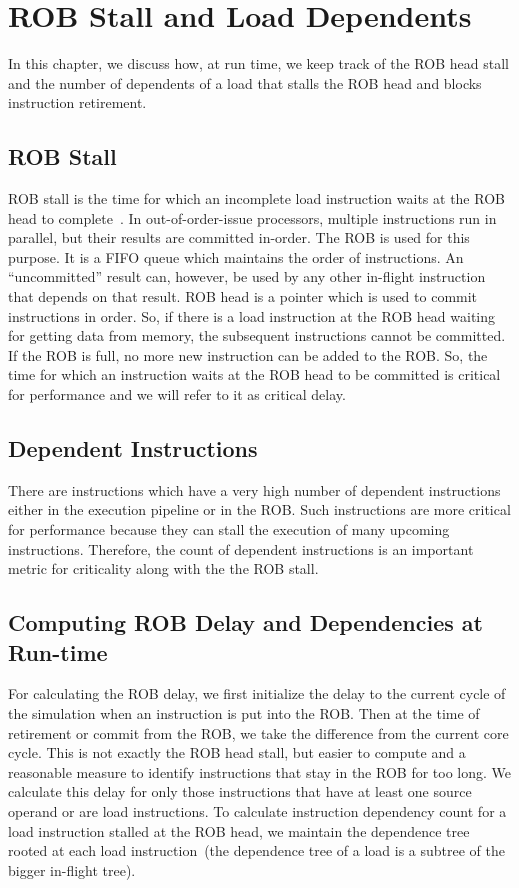 
\chapter{ROB Stall and Load Dependents}\label{ROB}\label{Chapter3:Recording ROB delay and ROB dependencies}
In this chapter, we discuss how, at run time, we keep track of the ROB head stall and the number of dependents of a load that stalls the ROB head and blocks instruction retirement.

\section{ROB Stall}
ROB stall is the  time for which an incomplete load instruction waits at the ROB head to complete~\cite{Superscalar}. In out-of-order-issue processors, multiple instructions run in parallel, but their results are committed in-order. The ROB is used for this purpose. It is a FIFO queue which maintains the order of instructions. An ``uncommitted'' result can, however, be used by any other in-flight instruction that depends on that result.
ROB head is a pointer which is used to commit instructions in order. So, if there is a load instruction at the ROB head waiting for getting data from memory, the subsequent instructions cannot be committed. If the ROB is full, no more new instruction can be added to the ROB.
So, the time for which an instruction waits at the ROB head to be committed is critical for performance and we will refer to it as critical delay.

\section{Dependent Instructions}
There are instructions which have a very high number of dependent instructions either in the execution pipeline or in the ROB. Such instructions are more critical for performance because they can stall the execution of many upcoming instructions. Therefore, the count of dependent instructions is an important metric for criticality along with the the ROB stall.

\section{Computing ROB Delay and Dependencies at Run-time}\label{ROB}
For calculating the ROB delay, we  first initialize the delay to the current cycle of the simulation when an instruction is put into the ROB. Then at the time of retirement or commit from the ROB, we take the difference from the current core cycle. This is not exactly the ROB head stall, but easier to compute and a reasonable measure to identify instructions that stay in the ROB for too long. We calculate this delay for only those
instructions that have at least one source operand or are load instructions.
To calculate instruction dependency count for a load instruction stalled at the ROB head, we maintain the dependence tree rooted at each load instruction~(the dependence tree of a load is a subtree of the bigger in-flight tree).

